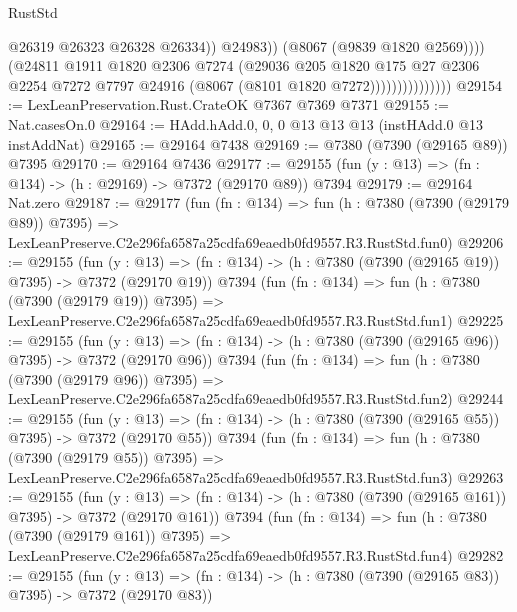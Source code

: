 \begin{lexlean}{RustStd}
\begin{coremodule}
                                      @26319
                                      @26323
                                      @26328
                                      @26334))
                                  @24983))
                              (@8067 (@9839 @1820 @2569))))
                          (@24811
                            @1911
                            @1820
                            @2306
                            @7274
                            (@29036
                              @205
                              @1820
                              @175
                              @27
                              @2306
                              @2254
                              @7272
                              @7797
                              @24916
                              (@8067 (@8101 @1820 @7272)))))))))))))))
@29154 := LexLeanPreservation.Rust.CrateOK @7367 @7369 @7371
@29155 := Nat.casesOn.{0}
@29164 := HAdd.hAdd.{0, 0, 0} @13 @13 @13 (instHAdd.{0} @13 instAddNat)
@29165 := @29164 @7438
@29169 := @7380 (@7390 (@29165 @89)) @7395
@29170 := @29164 @7436
@29177 := @29155 (fun (y : @13) => (fn : @134) -> (h : @29169) -> @7372 (@29170 @89)) @7394
@29179 := @29164 Nat.zero
@29187 := @29177
    (fun (fn : @134) =>
    fun (h : @7380 (@7390 (@29179 @89)) @7395) =>
    LexLeanPreserve.C2e296fa6587a25cdfa69eaedb0fd9557.R3.RustStd.fun0)
@29206 := @29155
    (fun (y : @13) => (fn : @134) -> (h : @7380 (@7390 (@29165 @19)) @7395) -> @7372 (@29170 @19))
    @7394
    (fun (fn : @134) =>
    fun (h : @7380 (@7390 (@29179 @19)) @7395) =>
    LexLeanPreserve.C2e296fa6587a25cdfa69eaedb0fd9557.R3.RustStd.fun1)
@29225 := @29155
    (fun (y : @13) => (fn : @134) -> (h : @7380 (@7390 (@29165 @96)) @7395) -> @7372 (@29170 @96))
    @7394
    (fun (fn : @134) =>
    fun (h : @7380 (@7390 (@29179 @96)) @7395) =>
    LexLeanPreserve.C2e296fa6587a25cdfa69eaedb0fd9557.R3.RustStd.fun2)
@29244 := @29155
    (fun (y : @13) => (fn : @134) -> (h : @7380 (@7390 (@29165 @55)) @7395) -> @7372 (@29170 @55))
    @7394
    (fun (fn : @134) =>
    fun (h : @7380 (@7390 (@29179 @55)) @7395) =>
    LexLeanPreserve.C2e296fa6587a25cdfa69eaedb0fd9557.R3.RustStd.fun3)
@29263 := @29155
    (fun (y : @13) => (fn : @134) -> (h : @7380 (@7390 (@29165 @161)) @7395) -> @7372 (@29170 @161))
    @7394
    (fun (fn : @134) =>
    fun (h : @7380 (@7390 (@29179 @161)) @7395) =>
    LexLeanPreserve.C2e296fa6587a25cdfa69eaedb0fd9557.R3.RustStd.fun4)
@29282 := @29155
    (fun (y : @13) => (fn : @134) -> (h : @7380 (@7390 (@29165 @83)) @7395) -> @7372 (@29170 @83))

\end{coremodule}
\end{lexlean}
